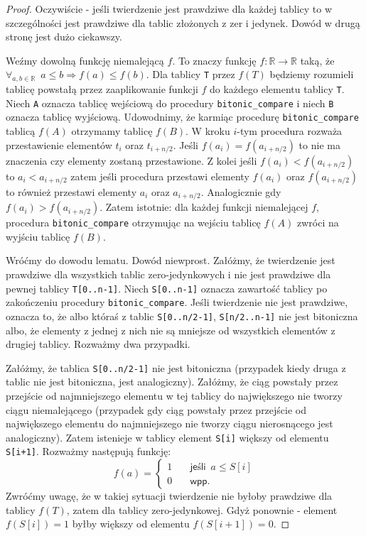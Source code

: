 \begin{proof}
 Oczywiście - jeśli twierdzenie jest prawdziwe dla każdej tablicy to w szczególności jest prawdziwe dla tablic złożonych z zer i jedynek.
 Dowód w drugą stronę jest dużo ciekawszy.
 
 Weźmy dowolną funkcję niemalejącą $f$.
 To znaczy funkcję $f: \mathbb{R} \rightarrow \mathbb{R}$ taką, że $\forall_{a, b \in \mathbb{R}} \enspace a \leq b \Rightarrow f(a) \leq f(b)$.
 Dla tablicy \texttt{T} przez $f(T)$ będziemy rozumieli tablicę powstałą przez zaaplikowanie funkcji $f$ do każdego elementu tablicy \texttt{T}.
 Niech \texttt{A} oznacza tablicę wejściową do procedury \texttt{bitonic\_compare} i niech \texttt{B} oznacza tablicę wyjściową.
 Udowodnimy, że karmiąc procedurę \texttt{bitonic\_compare} tablicą $f(A)$ otrzymamy tablicę $f(B)$.
 W kroku $i$-tym procedura rozważa przestawienie elementów $t_i$ oraz $t_{i+n/2}$.
 Jeśli $f(a_i) = f(a_{i+n/2})$ to nie ma znaczenia czy elementy zostaną przestawione.
 Z kolei jeśli $f(a_i) < f(a_{i+n/2})$ to $a_i < a_{i+n/2}$ zatem jeśli procedura przestawi elementy $f(a_i)$ oraz $f(a_{i+n/2})$ to również przestawi elementy $a_i$ oraz $a_{i+n/2}$.
 Analogicznie gdy $f(a_i) > f(a_{i+n/2})$.
 Zatem istotnie: dla każdej funkcji niemalejącej $f$, procedura \texttt{bitonic\_compare} otrzymując na wejściu tablicę $f(A)$ zwróci na wyjściu tablicę $f(B)$.
 
 Wróćmy do dowodu lematu.
 Dowód niewprost.
 Załóżmy, że twierdzenie jest prawdziwe dla wszystkich tablic zero-jedynkowych i nie jest prawdziwe dla pewnej tablicy \texttt{T[0..n-1]}.
 Niech \texttt{S[0..n-1]} oznacza zawartość tablicy po zakończeniu procedury \texttt{bitonic\_compare}.
 Jeśli twierdzenie nie jest prawdziwe, oznacza to, że albo któraś z tablic \texttt{S[0..n/2-1]}, \texttt{S[n/2..n-1]} nie jest bitoniczna albo, że elementy z jednej z nich nie są mniejsze od wszystkich elementów z drugiej tablicy.
 Rozważmy dwa przypadki.
 
 Załóżmy, że tablica \texttt{S[0..n/2-1]} nie jest bitoniczna (przypadek kiedy druga z tablic nie jest bitoniczna, jest analogiczny).
 Załóżmy, że ciąg powstały przez przejście od najmniejszego elementu w tej tablicy do największego nie tworzy ciągu niemalejącego (przypadek gdy ciąg powstały przez przejście od największego elementu do najmniejszego nie tworzy ciągu nierosnącego jest analogiczny).
 Zatem istenieje w tablicy element \texttt{S[i]} większy od elementu \texttt{S[i+1]}.
 Rozważmy następują funkcję:
 \[   
  f(a) = 
     \begin{cases}
       1 &\quad\textsf{jeśli} \enspace a \leq S[i]\\
       0 &\quad\textsf{wpp.}
     \end{cases}
 \]
 Zwróćmy uwagę, że w takiej sytuacji twierdzenie nie byłoby prawdziwe dla tablicy $f(T)$, zatem dla tablicy zero-jedynkowej.
 Gdyż ponownie - element $f(S[i]) = 1$ byłby większy od elementu $f(S[i+1]) = 0$.
 

\end{proof}
